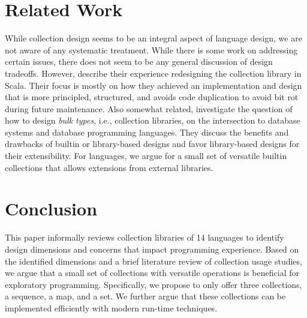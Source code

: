 \documentclass[sigconf, 10pt]{acmart}
\def\LangCnt{14\xspace}
\begin{document}
% 


\section{Related Work}

While collection design seems to be an integral aspect of language design,
we are not aware of any systematic treatment.
While there is some work on addressing certain 
issues\citep{Cook:1992:ISS,Black:2003:ATS,Chakravarty:2005:ATC,Garcia:2007},
there does not seem to be any general discussion of design tradeoffs.
However, \citet{Odersky:2009} describe their experience
redesigning the collection library in Scala.
Their focus is mostly on how they achieved an implementation and design
that is more principled, structured, and avoids code duplication
to avoid bit rot during future maintenance.
Also somewhat related, \citet{Matthes:2000:BT} investigate the question of how to design \emph{bulk types}, i.e., collection libraries, on the intersection to database systems and database programming languages.
They discuss the benefits and drawbacks of builtin or library-based designs and favor library-based designs for their extensibility.
For languages, we argue for a small set of versatile builtin collections
that allows extensions from external libraries.

\section{Conclusion}

This paper informally reviews collection libraries of \LangCnt languages to identify
design dimensions and concerns that impact programming experience.
Based on the identified dimensions
and a brief literature review of collection usage studies,
we argue that a small set of collections with versatile operations
is beneficial for exploratory programming.
Specifically, we propose to only offer three collections, a sequence, a map, and a set.
We further argue that these collections can be implemented efficiently
with modern run-time techniques.
\end{document}

